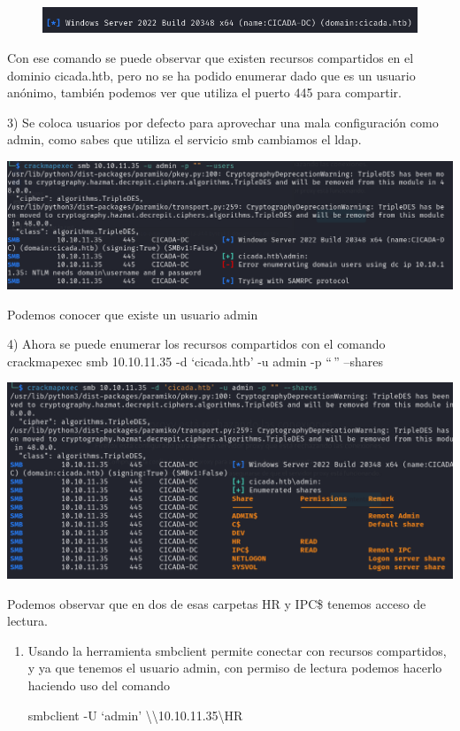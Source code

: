 \documentclass[
  letterpaper,
  DIV=11,
  numbers=noendperiod]{scrreprt}
\begin{document}
\begin{figure}

{\centering \includegraphics{Unidades/unidad10/imagenes/4.png}

}

\end{figure}

Con ese comando se puede observar que existen recursos compartidos en el
dominio cicada.htb, pero no se ha podido enumerar dado que es un usuario
anónimo, también podemos ver que utiliza el puerto 445 para compartir.

3) Se coloca usuarios por defecto para aprovechar una mala configuración
como admin, como sabes que utiliza el servicio smb cambiamos el ldap.

\includegraphics{Unidades/unidad10/imagenes/5.png}

Podemos conocer que existe un usuario admin

4) Ahora se puede enumerar los recursos compartidos con el comando
crackmapexec smb 10.10.11.35 -d `cicada.htb' -u admin -p ``\,'' --shares

\includegraphics{Unidades/unidad10/imagenes/6.png}

Podemos observar que en dos de esas carpetas HR y IPC\$ tenemos acceso
de lectura.

\begin{enumerate}
\def\labelenumi{\arabic{enumi})}
\setcounter{enumi}{4}
\item
  Usando la herramienta smbclient permite conectar con recursos
  compartidos, y ya que tenemos el usuario admin, con permiso de lectura
  podemos hacerlo haciendo uso del comando

  smbclient -U `admin'
  \textbackslash\textbackslash10.10.11.35\textbackslash HR
\end{enumerate}
\end{document}
